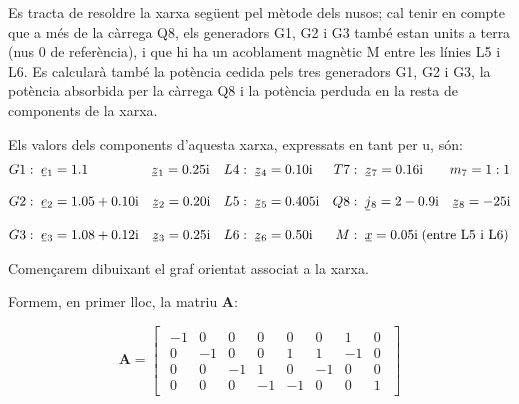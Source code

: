 \begin{exemple}\label{ex:XarxaAmbAcobl}
	\addcontentsxms{\XarxaAmbAcobl}
    Es tracta de resoldre la xarxa següent pel mètode dels nusos; cal
    tenir en compte que a més de la càrrega Q8, els generadors G1, G2 i
    G3 també estan units a terra (nus 0 de referència), i que hi ha un
    acoblament magnètic M entre les línies L5 i L6. Es calcularà també
    la potència cedida pels tres generadors G1, G2 i G3, la potència
    absorbida per la càrrega Q8 i la potència perduda en la resta de
    components de la xarxa.
    \begin{center}
       
    \end{center}

    Els valors dels components d'aquesta xarxa, expressats en tant per u, són:
    \begin{align*}
       G1 &:\; \cmplx{e}_1 = \num{1,1} \qquad\qquad\;\;\, \cmplx{z}_1 = \complexnum{j 0,25} & L4 &:\; \cmplx{z}_4 = \complexnum{j 0,10} & T7 &:\; \cmplx{z}_7 = \complexnum{j 0,16} \quad\quad m_7=1:1\\*[3mm]
       G2 &:\; \cmplx{e}_2 = \complexnum{1,05+j0,10} \quad \cmplx{z}_2 = \complexnum{j 0,20} & L5 &:\; \cmplx{z}_5 = \complexnum{j 0,405}  & Q8 &:\; \cmplx{j}_8 = \complexnum{2-j0,9} \quad \cmplx{z}_8 = \complexnum{-j25} \\[3mm]
       G3 &:\; \cmplx{e}_3 = \complexnum{1,08+j0,12} \quad \cmplx{z}_3 = \complexnum{j 0,25} & L6 &:\; \cmplx{z}_6 = \complexnum{j 0,50} & M &:\; \cmplx{x} = \complexnum{j0,05}\; \text{(entre L5 i L6)}
    \end{align*}

    Començarem dibuixant el graf orientat associat a la xarxa.
    \begin{center}
         
    \end{center}

	Formem, en primer lloc, la matriu $\boldsymbol{A}$:
	
    \[
       \boldsymbol{A} = 
       \begin{bmatrix}\begin{array}{rrrrrrrr}
         -1 & 0 & 0 & 0 & 0 & 0 & 1 & 0 \\
         0 & -1 & 0 & 0 & 1 & 1 & -1 & 0 \\
         0 & 0 & -1 & 1 & 0 & -1 & 0 & 0 \\
         0 & 0 & 0 & -1 & -1 & 0 & 0 & 1
       \end{array}\end{bmatrix}
    \]


\end{exemple}
